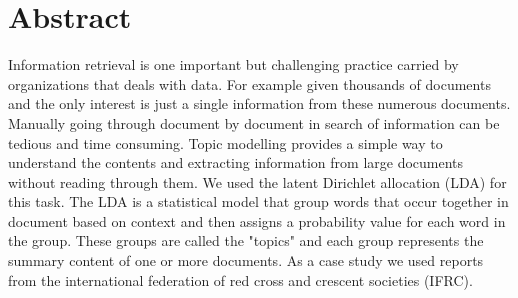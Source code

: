 
\chapter*{Abstract} 
Information retrieval is one  important but challenging practice carried by organizations that deals with data.
For example given thousands of documents and the only interest is just a single information from these numerous documents.
Manually going through document by document  in search of information can be tedious and time consuming.
Topic modelling  provides a simple way to understand the contents and extracting
information from  large documents without  reading through them.
We used the latent Dirichlet allocation (LDA) for this task.
The LDA  is a statistical model that group
words that occur together in document based on context and then assigns a probability value for each word in the group. These groups are called the "topics" and each group represents the summary content of one or more documents. 
As a case study we used reports from the
international federation of red cross and crescent societies (IFRC).


%
%
%





